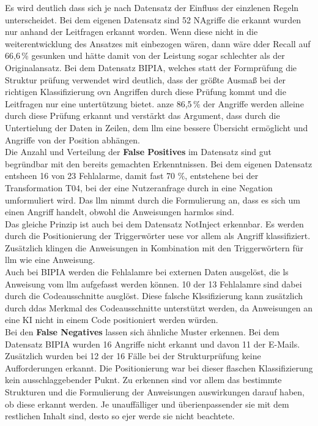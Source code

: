 Es wird deutlich dass sich je nach Datensatz der Einfluss der einzlenen Regeln unterscheidet. Bei dem eigenen Datensatz sind 52 NAgriffe die erkannt wurden nur anhand
der Leitfragen erkannt worden. Wenn diese nicht in die weiterentwicklung des Ansatzes mit einbezogen wären, dann wäre dder Recall auf 66,6\,\% gesunken und hätte
damit von der Leistung sogar schlechter als der Originalansatz. Bei dem Datensatz BIPIA, welches statt der Formprüfung die Struktur prüfung verwendet wird deutlich,
dass der größte Ausmaß bei der richtigen Klassifizierung ovn Angriffen durch diese Prüfung kommt und die Leitfragen nur eine untertützung bietet. anze 86,5\,\%
der Angriffe werden alleine durch diese Prüfung erkannt und verstärkt das Argument, dass durch die Untertielung der Daten in Zeilen, dem \ac{llm} eine bessere
Übersicht ermöglicht und Angriffe von der Position abhängen. \\
Die Anzahl und Verteilung der \textbf{False Positives} im Datensatz sind gut begründbar mit den bereits gemachten Erkenntnissen. Bei dem eigenen Datensatz entsheen 16 von 
23 Fehlalarme, damit fast 70 \%, entstehene bei der Transformation T04, bei der eine Nutzeranfrage durch in eine Negation umformuliert wird. Das \ac{llm} nimmt durch
die Formulierung an, dass es sich um einen Angriff handelt, obwohl die Anweisungen harmlos sind. \\
Das gleiche Prinzip ist auch bei dem Datensatz NotInject erkennbar. Es werden durch die Positionierung der Triggerwörter uese vor allem als Angriff klassifiziert. 
Zusätzlich klingen die Anweisungen in Kombination mit den Triggerwörtern für \ac{llm} wie eine Anweisung. \\
Auch bei BIPIA werden die Fehlalamre bei externen Daten ausgelöst, die ls Anweisung vom \ac{llm} aufgefasst werden können. 10 der 13 Fehlalamre sind dabei durch
die Codeausschnitte ausglöst. Diese falsche Klssifizierung kann zusätzlich durch ddas Merkmal des Codeausschnitte unterstützt werden, da Anweisungen an eine KI 
nicht in einem Code positioniert werden würden.\\
Bei den \textbf{False Negatives} lassen sich ähnliche Muster erkennen. Bei dem Datensatz BIPIA wurden 16 Angriffe nicht erkannt und davon 11 der E-Mails. Zusätzlich 
wurden bei 12 der 16 Fälle bei der Strukturprüfung keine Aufforderungen erkannt. Die Positionierung war bei dieser flaschen Klassifizierung kein ausschlaggebender
Puknt. Zu erkennen sind vor allem das bestimmte Strukturen und die Formulierung der Anweisungen auswirkungen darauf haben, ob diese erkannt werden. Je unauffälliger
und überienpassender sie mit dem restlichen Inhalt sind, desto so ejer werde sie nicht beachtete. 

